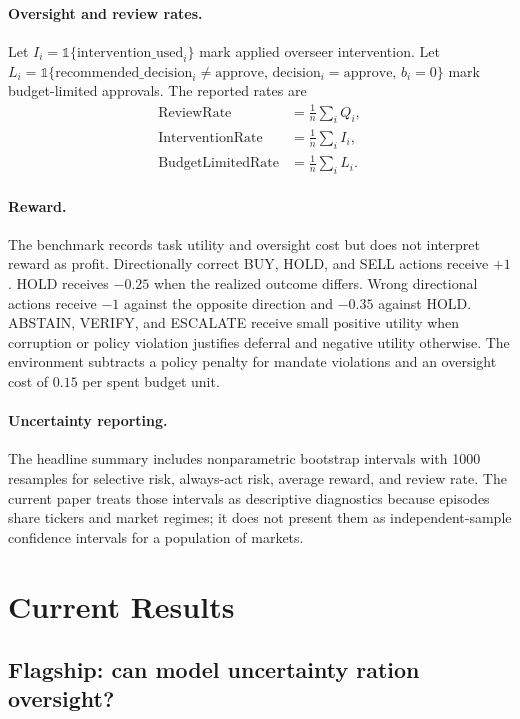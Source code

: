 \documentclass[10pt,twocolumn]{article}
\newcommand{\indicator}{\mathbb{1}}
\begin{document}
\paragraph{Oversight and review rates.}
Let \(I_i=\indicator\{\mathrm{intervention\_used}_i\}\) mark applied overseer intervention. Let \(L_i=\indicator\{\mathrm{recommended\_decision}_i\neq\mathrm{approve},\,\mathrm{decision}_i=\mathrm{approve},\,b_i=0\}\) mark budget-limited approvals. The reported rates are
\begin{align}
\operatorname{ReviewRate} &= \frac{1}{n}\sum_i Q_i, \nonumber\\
\operatorname{InterventionRate} &= \frac{1}{n}\sum_i I_i, \label{eq:oversight-rates}\\
\operatorname{BudgetLimitedRate} &= \frac{1}{n}\sum_i L_i. \nonumber
\end{align}

\paragraph{Reward.}
The benchmark records task utility and oversight cost but does not interpret reward as profit. Directionally correct BUY, HOLD, and SELL actions receive \(+1\). HOLD receives \(-0.25\) when the realized outcome differs. Wrong directional actions receive \(-1\) against the opposite direction and \(-0.35\) against HOLD. ABSTAIN, VERIFY, and ESCALATE receive small positive utility when corruption or policy violation justifies deferral and negative utility otherwise. The environment subtracts a policy penalty for mandate violations and an oversight cost of \(0.15\) per spent budget unit.

\paragraph{Uncertainty reporting.}
The headline summary includes nonparametric bootstrap intervals with 1000 resamples for selective risk, always-act risk, average reward, and review rate. The current paper treats those intervals as descriptive diagnostics because episodes share tickers and market regimes; it does not present them as independent-sample confidence intervals for a population of markets.

\section{Current Results}

\subsection{Flagship: can model uncertainty ration oversight?}
\end{document}
